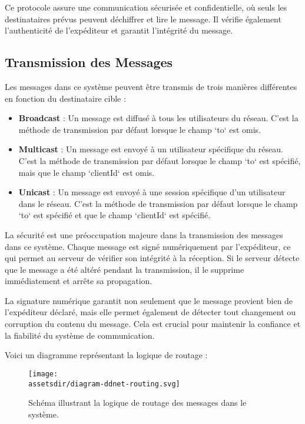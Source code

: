 Ce protocole assure une communication sécurisée et confidentielle, où seuls les destinataires prévus peuvent déchiffrer et lire le message. Il vérifie également l'authenticité de l'expéditeur et garantit l'intégrité du message.

\subsection{Transmission des Messages}

Les messages dans ce système peuvent être transmis de trois manières différentes en fonction du destinataire cible :

\begin{itemize}
\item \textbf{Broadcast} : Un message est diffusé à tous les utilisateurs du réseau. C'est la méthode de transmission par défaut lorsque le champ `to` est omis.
\item \textbf{Multicast} : Un message est envoyé à un utilisateur spécifique du réseau. C'est la méthode de transmission par défaut lorsque le champ `to` est spécifié, mais que le champ `clientId` est omis.
\item \textbf{Unicast} : Un message est envoyé à une session spécifique d'un utilisateur dans le réseau. C'est la méthode de transmission par défaut lorsque le champ `to` est spécifié et que le champ `clientId` est spécifié.
\end{itemize}

La sécurité est une préoccupation majeure dans la transmission des messages dans ce système. Chaque message est signé numériquement par l'expéditeur, ce qui permet au serveur de vérifier son intégrité à la réception. Si le serveur détecte que le message a été altéré pendant la transmission, il le supprime immédiatement et arrête sa propagation.

La signature numérique garantit non seulement que le message provient bien de l'expéditeur déclaré, mais elle permet également de détecter tout changement ou corruption du contenu du message. Cela est crucial pour maintenir la confiance et la fiabilité du système de communication.

Voici un diagramme représentant la logique de routage :

\begin{figure}[H]
  \begin{center}
      \texttt{[image: \\assetsdir/diagram-ddnet-routing.svg]}
  \end{center}
  \caption[Logique de Routage des Messages]{Schéma illustrant la logique de routage des messages dans le système.}
\end{figure}


